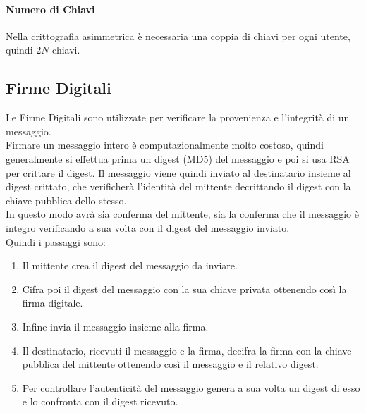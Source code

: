 \documentclass[12pt, a4paper, openany]{book}
\begin{document}
    \paragraph{Numero di Chiavi} Nella crittografia asimmetrica è necessaria una coppia di chiavi per ogni utente, quindi $2N$ chiavi.

\subsection{Firme Digitali}
Le Firme Digitali sono utilizzate per verificare la provenienza e l'integrità di un messaggio.
\\Firmare un messaggio intero è computazionalmente molto costoso, quindi generalmente si effettua prima un digest (MD5) del messaggio e poi si usa RSA per crittare il digest.
Il messaggio viene quindi inviato al destinatario insieme al digest crittato, che verificherà l'identità del mittente decrittando il digest con la chiave pubblica dello stesso.
\\In questo modo avrà sia conferma del mittente, sia la conferma che il messaggio è integro verificando a sua volta con il digest del messaggio inviato.
\\Quindi i passaggi sono:
\begin{enumerate}
    \item Il mittente crea il digest del messaggio da inviare.
    \item Cifra poi il digest del messaggio con la sua chiave privata ottenendo così la firma digitale.
    \item Infine invia il messaggio insieme alla firma.
    \item Il destinatario, ricevuti il messaggio e la firma, decifra la firma con la chiave pubblica del mittente ottenendo così il messaggio e il relativo digest.
    \item Per controllare l'autenticità del messaggio genera a sua volta un digest di esso e lo confronta con il digest ricevuto.
\end{enumerate}

\end{document}

